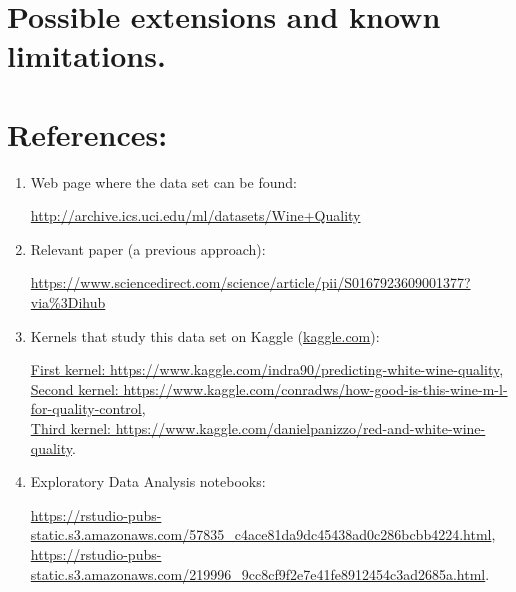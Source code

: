 \documentclass[10pt]{article}
\begin{document}
\section{Possible extensions and known limitations.}
\section{References:}
\begin{enumerate}
  \item Web page where the data set can be found:

  \href{http://archive.ics.uci.edu/ml/datasets/Wine+Quality}{ http://archive.ics.uci.edu/ml/datasets/Wine+Quality}

  \item Relevant paper (a previous approach):

  \href{https://www.sciencedirect.com/science/article/pii/S0167923609001377?via\%3Dihub}{ https://www.sciencedirect.com/science/article/pii/S0167923609001377?via\%3Dihub}

  \item Kernels that study this data set on Kaggle (\href{www.kaggle.com}{kaggle.com}):

  \href{https://www.kaggle.com/indra90/predicting-white-wine-quality}{First kernel: https://www.kaggle.com/indra90/predicting-white-wine-quality},\\
  \href{https://www.kaggle.com/conradws/how-good-is-this-wine-m-l-for-quality-control}{Second kernel: https://www.kaggle.com/conradws/how-good-is-this-wine-m-l-for-quality-control},\\
  \href{https://www.kaggle.com/danielpanizzo/red-and-white-wine-quality}{Third kernel: https://www.kaggle.com/danielpanizzo/red-and-white-wine-quality}.

  \item Exploratory Data Analysis notebooks:

  \href{https://rstudio-pubs-static.s3.amazonaws.com/57835\_c4ace81da9dc45438ad0c286bcbb4224.html}{ https://rstudio-pubs-static.s3.amazonaws.com/57835\_c4ace81da9dc45438ad0c286bcbb4224.html},\\
  \href{https://rstudio-pubs-static.s3.amazonaws.com/219996\_9cc8cf9f2e7e41fe8912454c3ad2685a.html}{ https://rstudio-pubs-static.s3.amazonaws.com/219996\_9cc8cf9f2e7e41fe8912454c3ad2685a.html}.



\end{enumerate}
\end{document}
